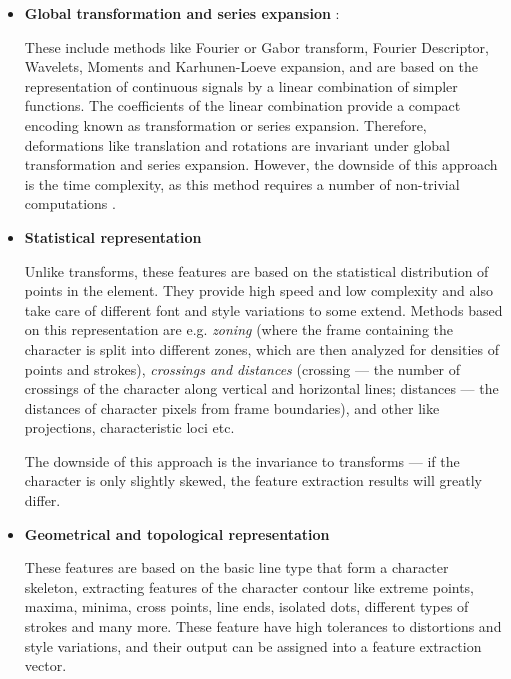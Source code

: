 \begin{itemize}

\item \textbf{Global transformation and series expansion}  :

These include methods like Fourier or Gabor transform, Fourier Descriptor, Wavelets, Moments and Karhunen-Loeve expansion, and are based on the representation of continuous signals by a linear combination of simpler functions. The coefficients of the linear combination provide a compact encoding known as transformation or series expansion. Therefore, deformations like translation and rotations are invariant under global transformation and series expansion. However, the downside of this approach is the time complexity, as this method requires a number of non-trivial computations {}.

\item \textbf{Statistical representation}

Unlike transforms, these features are based on the statistical distribution of points in the element. They provide high speed and low complexity and also take care of different font and style variations to some extend. Methods based on this representation are e.g. \emph{zoning} (where the frame containing the character is split into different zones, which are then analyzed for densities of points and strokes), \emph{crossings and distances} (crossing --- the number of crossings of the character along vertical and horizontal lines; distances --- the distances of character pixels from frame boundaries), and other like projections, characteristic loci etc. 

The downside of this approach is the invariance to transforms --- if the character is only slightly skewed, the feature extraction results will greatly differ.

\item \textbf{Geometrical and topological representation}

These features are based on the basic line type that form a character skeleton, extracting features of the character contour like extreme points, maxima, minima, cross points, line ends, isolated dots, different types of strokes and many more. These feature have high tolerances to distortions and style variations, and their output can be assigned into a feature extraction vector.

\end{itemize}

